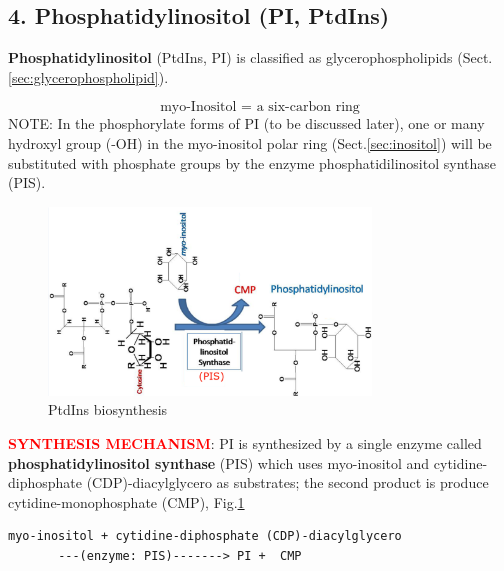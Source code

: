 \subsection{4. Phosphatidylinositol (PI, PtdIns)}
\label{sec:phosphatidylinositol}

{\bf Phosphatidylinositol} (PtdIns, PI) is classified as glycerophospholipids
(Sect.\ref{sec:glycerophospholipid}).

\begin{equation}
\text{myo-Inositol = a six-carbon ring} 
\end{equation}
NOTE: In the phosphorylate forms of PI (to be discussed later), one or many
hydroxyl group (-OH) in the myo-inositol polar ring (Sect.\ref{sec:inositol})
will be substituted with phosphate groups by the enzyme phosphatidilinositol
synthase (PIS).

\begin{figure}[hbt]
  \centerline{\includegraphics[height=5cm,
    angle=0]{./images/PtdIns-biosynthesis.eps}}
  \caption{PtdIns biosynthesis}
  \label{fig:PtdIns-biosynthesis}
\end{figure}

\textcolor{red}{\bf SYNTHESIS MECHANISM}: PI is synthesized by a single enzyme
called {\bf phosphatidylinositol synthase} (PIS) which uses myo-inositol and
cytidine-diphosphate (CDP)-diacylglycero as substrates; the second product is
produce cytidine-monophosphate (CMP), Fig.\ref{fig:PtdIns-biosynthesis}

\begin{verbatim}
myo-inositol + cytidine-diphosphate (CDP)-diacylglycero
       ---(enzyme: PIS)-------> PI +  CMP
\end{verbatim}

